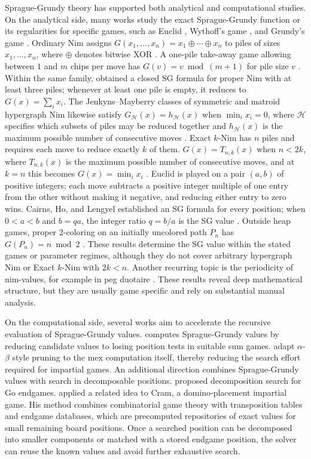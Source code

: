 \documentclass[review]{elsarticle}
\begin{document}
Sprague-Grundy theory has supported both analytical and computational studies. 
On the analytical side, many works study the exact Sprague-Grundy function or its regularities for specific games, such as Euclid \cite{cairns2011,nivasch2006}, Wythoff's game \cite{blass1990}, and Grundy's game \cite{guy1956g}. 
{\color{red}
Ordinary Nim assigns $G(x_1,\ldots,x_n)=x_1\oplus\cdots\oplus x_n$ to piles of sizes $x_1,\ldots,x_n$, where $\oplus$ denotes bitwise XOR \cite{Bou1901}.
A one-pile take-away game allowing between $1$ and $m$ chips per move has $G(v)=v\bmod(m+1)$ for pile size $v$ \cite{Gol1966}.
Within the same family, \citet{BorGHM2021} obtained a closed SG formula for proper Nim with at least three piles; whenever at least one pile is empty, it reduces to $G(x)=\sum_i x_i$.
The Jenkyns--Mayberry classes of symmetric and matroid hypergraph Nim likewise satisfy $G_{\mathcal H}(x)=h_{\mathcal H}(x)$ when $\min_i x_i=0$, where $\mathcal H$ specifies which subsets of piles may be reduced together and $h_{\mathcal H}(x)$ is the maximum possible number of consecutive moves \cite{BorGHMM2019a,BorGHMM2019b}.
Exact $k$-Nim has $n$ piles and requires each move to reduce exactly $k$ of them.
$G(x)=T_{n,k}(x)$ when $n<2k$, where $T_{n,k}(x)$ is the maximum possible number of consecutive moves, and at $k=n$ this becomes $G(x)=\min_i x_i$ \cite{BorGHMM2018}.
Euclid is played on a pair $(a,b)$ of positive integers; each move subtracts a positive integer multiple of one entry from the other without making it negative, and reducing either entry to zero wins.
Cairns, Ho, and Lengyel established an SG formula for every position; when $0<a<b$ and $b=qa$, the integer ratio $q=b/a$ is the SG value \cite{cairns2011}.
Outside heap games, proper $2$-coloring on an initially uncolored path $P_n$ has $G(P_n)=n\bmod 2$ \cite{BeaBD2013}.
These results determine the SG value within the stated games or parameter regimes, although they do not cover arbitrary hypergraph Nim or Exact $k$-Nim with $2k<n$.
}
Another recurring topic is the periodicity of nim-values, for example in peg duotaire \cite{grossman2004}. 
These results reveal deep mathematical structure, but they are usually game specific and rely on substantial manual analysis.

On the computational side, several works aim to accelerate the recursive evaluation of Sprague-Grundy values. 
\citet{lemoine2012} computes Sprague-Grundy values by reducing candidate values to losing position tests in suitable sum games. 
\citet{BelM2020} adapt $\alpha$-$\beta$ style pruning to the mex computation itself, thereby reducing the search effort required for impartial games. 
An additional direction combines Sprague-Grundy values with search in decomposable positions. 
\citet{muller1999} proposed decomposition search for Go endgames. 
\citet{uiterwijk2019} applied a related idea to Cram, a domino-placement impartial game. 
His method combines combinatorial game theory with transposition tables and endgame databases, which are precomputed repositories of exact values for small remaining board positions. 
Once a searched position can be decomposed into smaller components or matched with a stored endgame position, the solver can reuse the known values and avoid further exhaustive search. 
\end{document}
